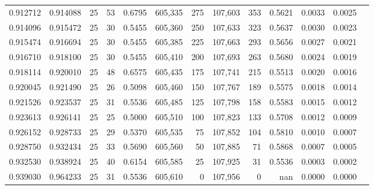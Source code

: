 \begin{tabular}{rrrrrrrrrrrrr}
0.912712 & 0.914088 &    25 &  53 &                                     0.6795 & 605,335 &     275 & 107,603 &     353 & 0.5621 & 0.0033 & 0.0025 \\
0.914096 & 0.915472 &    25 &  30 &                                     0.5455 & 605,360 &     250 & 107,633 &     323 & 0.5637 & 0.0030 & 0.0023 \\
0.915474 & 0.916694 &    25 &  30 &                                     0.5455 & 605,385 &     225 & 107,663 &     293 & 0.5656 & 0.0027 & 0.0021 \\
0.916710 & 0.918100 &    25 &  30 &                                     0.5455 & 605,410 &     200 & 107,693 &     263 & 0.5680 & 0.0024 & 0.0019 \\
0.918114 & 0.920010 &    25 &  48 &                                     0.6575 & 605,435 &     175 & 107,741 &     215 & 0.5513 & 0.0020 & 0.0016 \\
0.920045 & 0.921490 &    25 &  26 &                                     0.5098 & 605,460 &     150 & 107,767 &     189 & 0.5575 & 0.0018 & 0.0014 \\
0.921526 & 0.923537 &    25 &  31 &                                     0.5536 & 605,485 &     125 & 107,798 &     158 & 0.5583 & 0.0015 & 0.0012 \\
0.923613 & 0.926141 &    25 &  25 &                                     0.5000 & 605,510 &     100 & 107,823 &     133 & 0.5708 & 0.0012 & 0.0009 \\
0.926152 & 0.928733 &    25 &  29 &                                     0.5370 & 605,535 &      75 & 107,852 &     104 & 0.5810 & 0.0010 & 0.0007 \\
0.928750 & 0.932434 &    25 &  33 &                                     0.5690 & 605,560 &      50 & 107,885 &      71 & 0.5868 & 0.0007 & 0.0005 \\
0.932530 & 0.938924 &    25 &  40 &                                     0.6154 & 605,585 &      25 & 107,925 &      31 & 0.5536 & 0.0003 & 0.0002 \\
0.939030 & 0.964233 &    25 &  31 &                                     0.5536 & 605,610 &       0 & 107,956 &       0 &    nan & 0.0000 & 0.0000 \\
\bottomrule
\end{tabular}
